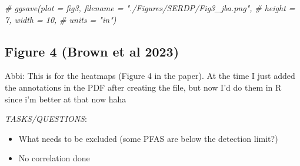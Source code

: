 \documentclass[
]{article}
\newenvironment{Shaded}{\begin{snugshade}}{\end{snugshade}}
\newcommand{\CommentTok}[1]{\textcolor[rgb]{0.56,0.35,0.01}{\textit{#1}}}
\providecommand{\tightlist}{%
  \setlength{\itemsep}{0pt}\setlength{\parskip}{0pt}}
\begin{document}
\begin{Shaded}
\begin{Highlighting}[]
\CommentTok{\# ggsave(plot = fig3, filename = "./Figures/SERDP/Fig3\_jba.png",}
\CommentTok{\#        height = 7, width = 10,}
\CommentTok{\#        units = "in")}
\end{Highlighting}
\end{Shaded}

\subsection{Figure 4 (Brown et al
2023)}\label{figure-4-brown-et-al-2023}

Abbi: This is for the heatmaps (Figure 4 in the paper). At the time I
just added the annotations in the PDF after creating the file, but now
I'd do them in R since i'm better at that now haha

\emph{TASKS/QUESTIONS}:

\begin{itemize}
\tightlist
\item
  What needs to be excluded (some PFAS are below the detection limit?)
\item
  No correlation done
\end{itemize}
\end{document}

